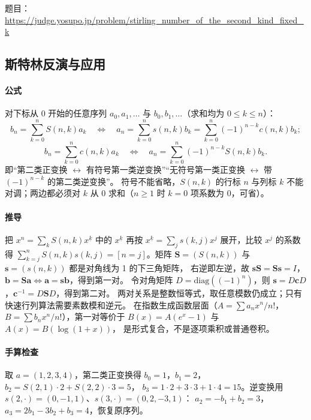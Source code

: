 题目：\url{https://judge.yosupo.jp/problem/stirling_number_of_the_second_kind_fixed_k}



\newpage

\subsection{斯特林反演与应用}\label{knowledge-stirling-inversion}
\paragraph{公式} 对下标从 0 开始的任意序列 $a_0,a_1,\dots$ 与 $b_0,b_1,\dots$（求和均为 $0\le k\le n$）：
\[
 b_n=\sum_{k=0}^n S(n,k)a_k
 \quad\Longleftrightarrow\quad
 a_n=\sum_{k=0}^n s(n,k)b_k=\sum_{k=0}^n(-1)^{n-k}c(n,k)b_k;
\]
\[
 b_n=\sum_{k=0}^n c(n,k)a_k
 \quad\Longleftrightarrow\quad
 a_n=\sum_{k=0}^n(-1)^{n-k}S(n,k)b_k.
\]
即“第二类正变换 $\leftrightarrow$ 有符号第一类逆变换”“无符号第一类正变换 $\leftrightarrow$ 带 $(-1)^{n-k}$ 的第二类逆变换”。
符号不能省略，$S(n,k)$ 的行标 $n$ 与列标 $k$ 不能对调；两边都必须对 $k$ 从 0 求和（$n\ge1$ 时 $k=0$ 项系数为 0，可省）。

\paragraph{推导} 把 $x^n=\sum_k S(n,k)x^{\underline k}$ 中的 $x^{\underline k}$ 再按 $x^{\underline k}=\sum_j s(k,j)x^j$ 展开，比较 $x^j$ 的系数得
$\sum_{k=j}^n S(n,k)s(k,j)=[n=j]$。矩阵 $\mathbf S=(S(n,k))$ 与 $\mathbf s=(s(n,k))$ 都是对角线为 1 的下三角矩阵，
右逆即左逆，故 $\mathbf s\mathbf S=\mathbf S\mathbf s=I$，$\mathbf b=\mathbf S\mathbf a\iff\mathbf a=\mathbf s\mathbf b$，得到第一对。
令对角矩阵 $D=\mathrm{diag}((-1)^n)$，则 $\mathbf s=D\mathbf cD$，$\mathbf c^{-1}=D\mathbf SD$，得到第二对。
两对关系是整数恒等式，取任意模数仍成立；只有快速行列算法需要素数模和逆元。
在指数生成函数层面（$A=\sum a_nx^n/n!$，$B=\sum b_nx^n/n!$），第一对等价于 $B(x)=A(e^x-1)$ 与 $A(x)=B(\log(1+x))$，
是形式复合，不是逐项乘积或普通卷积。

\paragraph{手算检查} 取 $a=(1,2,3,4)$，第二类正变换得 $b_0=1$，$b_1=2$，$b_2=S(2,1)\cdot2+S(2,2)\cdot3=5$，
$b_3=1\cdot2+3\cdot3+1\cdot4=15$。逆变换用 $s(2,\cdot)=(0,-1,1)$、$s(3,\cdot)=(0,2,-3,1)$：
$a_2=-b_1+b_2=3$，$a_3=2b_1-3b_2+b_3=4$，恢复原序列。

